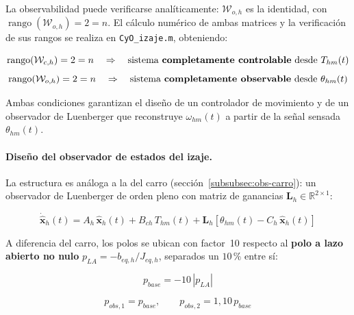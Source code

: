 \documentclass[12pt, a4paper]{article}
\begin{document}
La observabilidad puede verificarse analíticamente: $\mathcal{W}_{o,h}$ es la identidad,
con $\operatorname{rango}(\mathcal{W}_{o,h}) = 2 = n$. El cálculo numérico de ambas
matrices y la verificación de sus rangos se realiza en \texttt{CyO\_izaje.m}, obteniendo:

\begin{equation}
    \label{eq:rank-c-h}
    \operatorname{rango}(\mathcal{W}_{c,h}) = 2 = n
    \quad\Rightarrow\quad
    \text{sistema \textbf{completamente controlable} desde } T_{hm}(t)
\end{equation}
\begin{equation}
    \label{eq:rank-o-h}
    \operatorname{rango}(\mathcal{W}_{o,h}) = 2 = n
    \quad\Rightarrow\quad
    \text{sistema \textbf{completamente observable} desde } \theta_{hm}(t)
\end{equation}

Ambas condiciones garantizan el diseño de un controlador de movimiento y de un observador
de Luenberger que reconstruye $\omega_{hm}(t)$ a partir de la señal sensada $\theta_{hm}(t)$.

\paragraph{Diseño del observador de estados del izaje.}\leavevmode
\label{subsubsec:obs-izaje}

La estructura es análoga a la del carro (sección~\ref{subsubsec:obs-carro}): un observador
de Luenberger de orden pleno con matriz de ganancias $\mathbf{L}_h \in \mathbb{R}^{2\times 1}$:

\begin{equation}
    \label{eq:obs-izaje}
    \dot{\hat{\mathbf{x}}}_h(t) = A_h\,\hat{\mathbf{x}}_h(t)
    + B_{ch}\,T_{hm}(t)
    + \mathbf{L}_h\!\left[\theta_{hm}(t) - C_h\,\hat{\mathbf{x}}_h(t)\right]
\end{equation}

A diferencia del carro, los polos se ubican con factor~10 respecto al \textbf{polo a
lazo abierto no nulo} $p_{LA} = -b_{eq,h}/J_{eq,h}$, separados un $10\,\mathrm{\%}$ entre sí:

\begin{equation}
    \label{eq:polo-base-obs-h}
    p_{base} = -10\,|p_{LA}|
\end{equation}

\begin{equation}
    \label{eq:polos-obs-izaje}
    p_{obs,1} = p_{base}, \qquad p_{obs,2} = 1{,}10\,p_{base}
\end{equation}
\end{document}
